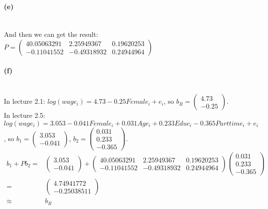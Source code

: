\documentclass{article}
\begin{document}
\paragraph{(e)}~\\

And then we can get the result: $P = \begin{pmatrix}
40.05063291 & 2.25949367 & 0.19620253\\
-0.11041552 & -0.49318932 & 0.24944964
\end{pmatrix}$

\paragraph{(f)}~\\
In lecture 2.1: $log(wage_{i}) = 4.73 - 0.25Female_{i} + e_{i}$, so $b_{R} = \begin{pmatrix}4.73\\-0.25\end{pmatrix}$.\\
In lecture 2.5: $log(wage_{i}) = 3.053 - 0.041Female_{i} + 0.031Age_{i} + 0.233Educ_{i} - 0.365Parttime_{i}+ e_{i}$, so $b_{1} = \begin{pmatrix}3.053\\-0.041\end{pmatrix}$, $b_{2} = \begin{pmatrix}0.031\\0.233\\-0.365\end{pmatrix}$.\\
\[\begin{aligned}
b_{1} + Pb_{2} = &\begin{pmatrix}3.053\\-0.041\end{pmatrix} + \begin{pmatrix}40.05063291 & 2.25949367 & 0.19620253\\-0.11041552 & -0.49318932 & 0.24944964\end{pmatrix}\begin{pmatrix}0.031\\0.233\\-0.365\end{pmatrix}\\
               = &\begin{pmatrix}4.74941772\\-0.25038511\end{pmatrix}\\
               \approx &b_{R}
\end{aligned}
\]
\end{document}
